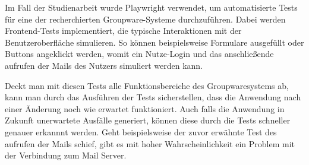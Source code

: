 Im Fall der Studienarbeit wurde Playwright verwendet, um automatisierte Tests für eine der recherchierten Groupware-Systeme durchzuführen.
Dabei werden Frontend-Tests implementiert, die typische Interaktionen mit der Benutzeroberfläche simulieren.
So können beispielsweise Formulare ausgefüllt oder Buttons angeklickt werden, womit ein Nutze-Login und das anschließende aufrufen der Mails des Nutzers simuliert werden kann.

Deckt man mit diesen Tests alle Funktionsbereiche des Groupwaresystems ab, kann man durch das Ausführen der Tests sicherstellen, dass die Anwendung nach einer Änderung noch wie erwartet funktioniert.
Auch falls die Anwendung in Zukunft unerwartete Ausfälle generiert, können diese durch die Tests schneller genauer erkannnt werden.
Geht beispielsweise der zuvor erwähnte Test des aufrufen der Mails schief, gibt es mit hoher Wahrscheinlichkeit ein Problem mit der Verbindung zum Mail Server.





